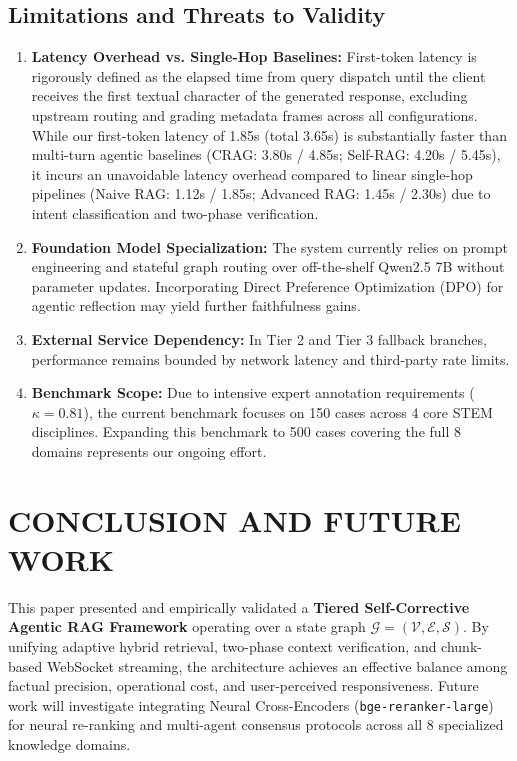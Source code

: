 \documentclass[conference]{IEEEtran}
\begin{document}
\subsection{Limitations and Threats to Validity}
\begin{enumerate}
    \item \textbf{Latency Overhead vs. Single-Hop Baselines:} First-token latency is rigorously defined as the elapsed time from query dispatch until the client receives the first textual character of the generated response, excluding upstream routing and grading metadata frames across all configurations. While our first-token latency of 1.85s (total 3.65s) is substantially faster than multi-turn agentic baselines (CRAG: 3.80s / 4.85s; Self-RAG: 4.20s / 5.45s), it incurs an unavoidable latency overhead compared to linear single-hop pipelines (Naive RAG: 1.12s / 1.85s; Advanced RAG: 1.45s / 2.30s) due to intent classification and two-phase verification.
    \item \textbf{Foundation Model Specialization:} The system currently relies on prompt engineering and stateful graph routing over off-the-shelf Qwen2.5 7B without parameter updates. Incorporating Direct Preference Optimization (DPO) for agentic reflection may yield further faithfulness gains.
    \item \textbf{External Service Dependency:} In Tier 2 and Tier 3 fallback branches, performance remains bounded by network latency and third-party rate limits.
    \item \textbf{Benchmark Scope:} Due to intensive expert annotation requirements ($\kappa = 0.81$), the current benchmark focuses on 150 cases across 4 core STEM disciplines. Expanding this benchmark to 500 cases covering the full 8 domains represents our ongoing effort.
\end{enumerate}

\section{CONCLUSION AND FUTURE WORK}
This paper presented and empirically validated a \textbf{Tiered Self-Corrective Agentic RAG Framework} operating over a state graph $\mathcal{G} = (\mathcal{V}, \mathcal{E}, \mathcal{S})$. By unifying adaptive hybrid retrieval, two-phase context verification, and chunk-based WebSocket streaming, the architecture achieves an effective balance among factual precision, operational cost, and user-perceived responsiveness. Future work will investigate integrating Neural Cross-Encoders (\texttt{bge-reranker-large}) for neural re-ranking and multi-agent consensus protocols across all 8 specialized knowledge domains.
\end{document}
